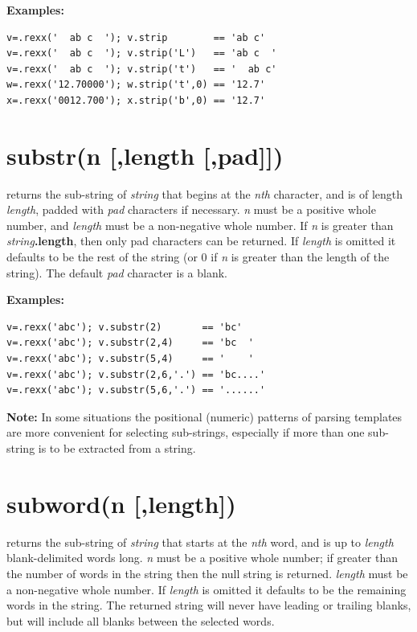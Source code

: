\textbf{Examples:}
\begin{lstlisting}
v=.rexx('  ab c  '); v.strip        == 'ab c'
v=.rexx('  ab c  '); v.strip('L')   == 'ab c  '
v=.rexx('  ab c  '); v.strip('t')   == '  ab c'
w=.rexx('12.70000'); w.strip('t',0) == '12.7'
x=.rexx('0012.700'); x.strip('b',0) == '12.7'
\end{lstlisting}

\section{substr(n [,length [,pad{]]})}\label{refsubstr}
returns the sub-string of \emph{string} that begins at the
\emph{n}\emph{th} character, and is of length \emph{length}, padded
with \emph{pad} characters if necessary.
\emph{n} must be a positive whole number, and \emph{length} must
be a non-negative whole number.
If \emph{n} is greater than \emph{string}\textbf{.length},
then only pad characters can be returned.
 If \emph{length} is omitted it defaults to be the rest of the
string (or 0 if \emph{n} is greater than the length of the string).
The default \emph{pad} character is a blank.
 
\textbf{Examples:}
\begin{lstlisting}
v=.rexx('abc'); v.substr(2)       == 'bc'
v=.rexx('abc'); v.substr(2,4)     == 'bc  '
v=.rexx('abc'); v.substr(5,4)     == '    '
v=.rexx('abc'); v.substr(2,6,'.') == 'bc....'
v=.rexx('abc'); v.substr(5,6,'.') == '......'
\end{lstlisting}
\textbf{Note: }In some situations the positional (numeric) patterns of parsing
templates are more convenient for selecting sub-strings, especially if
more than one sub-string is to be extracted from a string.

\section{subword(n [,length{]})}\label{refsubword}
returns the sub-string of \emph{string} that starts at the
\emph{n}\emph{th} word, and is up to \emph{length} blank-delimited
words long.
\emph{n} must be a positive whole number; if greater than the number
of words in the string then the null string is returned.
\emph{length} must be a non-negative whole number.
If \emph{length} is omitted it defaults to be the remaining words
in the string.
The returned string will never have leading or trailing blanks, but
will include all blanks between the selected words.
 
